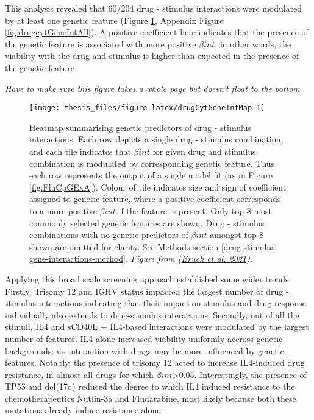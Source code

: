\documentclass[11pt, a4paper, twosided]{book}
\begin{document}
This analysis revealed that 60/204 drug - stimulus interactions were modulated by at least one genetic feature (Figure \ref{fig:drugCytGeneIntMap}, Appendix Figure \ref{fig:drugcytGeneIntAll}). A positive coefficient here indicates that the presence of the genetic feature is associated with more positive \(\beta{int}\), in other words, the viability with the drug and stimulus is higher than expected in the presence of the genetic feature.

\emph{Have to make sure this figure takes a whole page but doesn't float to the bottom}


\begin{figure}

{\centering \texttt{[image: thesis\_files/figure-latex/drugCytGeneIntMap-1]} 

}

\caption{Heatmap summarising genetic predictors of drug - stimulus interactions. Each row depicts a single drug - stimulus combination, and each tile indicates that \(\beta{int}\) for given drug and stimulus combination is modulated by corresponding genetic feature. Thus each row represents the output of a single model fit (as in Figure \ref{fig:FluCpGExA}). Colour of tile indicates size and sign of coefficient assigned to genetic feature, where a positive coefficient corresponds to a more positive \(\beta{int}\) if the feature is present. Only top 8 most commonly selected genetic features are shown. Drug - stimulus combinations with no genetic predictors of \(\beta{int}\) amongst top 8 shown are omitted for clarity. See Methods section \ref{drug-stimulus-gene-interactions-method}. \emph{Figure from (\protect\hyperlink{ref-Giles2021}{Bruch et al. 2021}).}}\label{fig:drugCytGeneIntMap}
\end{figure}
Applying this broad scale screening approach established some wider trends. Firstly, Trisomy 12 and IGHV status impacted the largest number of drug - stimulus interactions,indicating that their impact on stimulus and drug response individually also extends to drug-stimulus interactions. Secondly, out of all the stimuli, IL4 and sCD40L + IL4-based interactions were modulated by the largest number of features. IL4 alone increased viability uniformly accross genetic backgrounds; its interaction with drugs may be more influenced by genetic features. Notably, the presence of trisomy 12 acted to increase IL4-induced drug resistance, in almost all drugs for which \(\beta{int}\)\textgreater0.05. Interestingly, the presence of TP53 and del(17q) reduced the degree to which IL4 induced resistance to the chemotherapeutics Nutlin-3a and Fludarabine, most likely because both these mutations already induce resistance alone.
\end{document}
